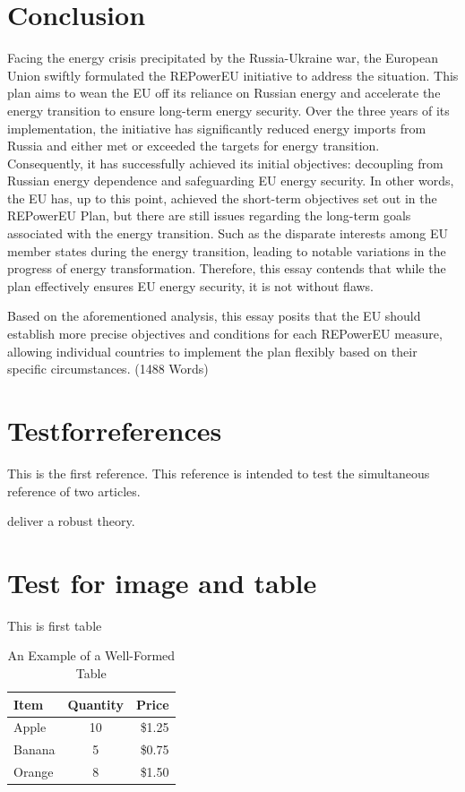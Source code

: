 \documentclass[12pt,a4paper]{article}
\begin{document}
\section{Conclusion}
Facing the energy crisis precipitated by the Russia-Ukraine war, the European Union swiftly formulated the REPowerEU initiative to address the situation. This plan aims to wean the EU off its reliance 
on Russian energy and accelerate the energy transition to ensure long-term energy security. Over the three years of its implementation, the initiative has significantly reduced energy imports from 
Russia and either met or exceeded the targets for energy transition. Consequently, it has successfully achieved its initial objectives: decoupling from Russian energy dependence and safeguarding EU 
energy security. In other words, the EU has, up to this point, achieved the short-term objectives set out in the REPowerEU Plan, but there are still issues regarding the long-term goals associated 
with the energy transition. Such as the disparate interests among EU member states during the energy transition, leading to notable variations in the progress of energy transformation. Therefore, 
this essay contends that while the plan effectively ensures EU energy security, it is not without flaws.

Based on the aforementioned analysis, this essay posits that the EU should establish more precise objectives and conditions for each REPowerEU measure, allowing individual countries to implement the 
plan flexibly based on their specific circumstances. (1488 Words)

\section{Testforreferences}
This is the first reference\parencite{andrikogiannopoulou_reassessing_2019}. This reference is intended to test the simultaneous reference of two articles\parencite{barras_false_nodate,lee_boosting_2024}.

\textcite{wang_robust_2024} deliver a robust theory.

\section{Test for image and table}

This is first table %
\begin{table}[htbp] %
\centering %
\caption{An Example of a Well-Formed Table} %
\label{tab:tab 1} %
\begin{tabular*}{\textwidth}{@{\extracolsep{\fill}} lcr @{}} %
\toprule
Item & Quantity & Price \\
\midrule
Apple & 10 & \$1.25 \\
Banana & 5 & \$0.75 \\
Orange & 8 & \$1.50 \\
\bottomrule
\end{tabular*}
\end{table}
\end{document}
